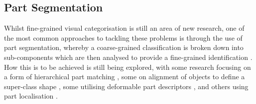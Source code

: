 \subsection{Part Segmentation}\label{ch:Background,sec:Fine-grainedCV,sub:PartSegmentation}
Whilst fine-grained visual categorisation is still an area of new research, one of the most common approaches to tackling these problems is through the use of part segmentation, whereby a coarse-grained classification is broken down into sub-components which are then analysed to provide a fine-grained identification \cite{zhang_part-based_2014}. How this is to be achieved is still being explored, with some research focusing on a form of hierarchical part matching \cite{xie_hierarchical_2013}, some on alignment of objects to define a super-class shape \cite{gavves_fine-grained_2013}, some utilising deformable part descriptors \cite{zhang_deformable_2013}, and others using part localisation \cite{liu_dog_2012}. 


